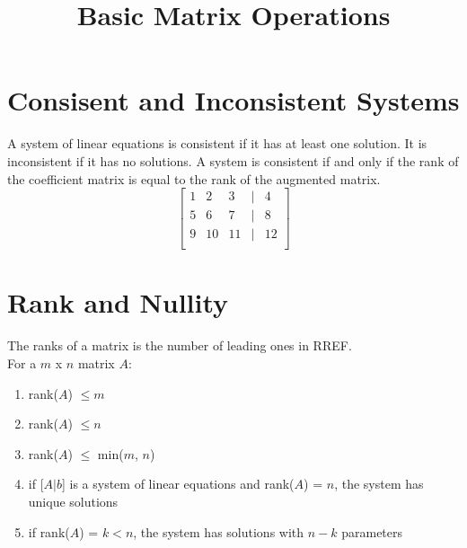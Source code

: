 \documentclass{article}
\title{Basic Matrix Operations}
\author{}
\date{}
\begin{document}
\maketitle

\section{Consisent and Inconsistent Systems}
A system of linear equations is consistent if it has at least one solution. It is inconsistent if it has no solutions. A system is consistent if and only if the rank of the coefficient matrix is equal to the rank of the augmented matrix.
\[
\begin{bmatrix}
1 & 2 & 3 & | & 4 \\
5 & 6 & 7 & | & 8 \\
9 & 10 & 11 & | & 12 \\
\end{bmatrix}
\]


\section{Rank and Nullity}
The ranks of a matrix is the number of leading ones in RREF. \\
For a $m$ x $n$ matrix $A$:
\begin{enumerate}
\item rank($A$) $\leq m$
\item rank($A$) $\leq n$
\item rank($A$) $\leq$ min($m$, $n$)
\item if [$A|b$] is a system of linear equations and rank($A$) = $n$, the system has unique solutions
\item if rank($A$) = $k < n$, the system has solutions with $n-k$ parameters
\end{enumerate}
\end{document}
